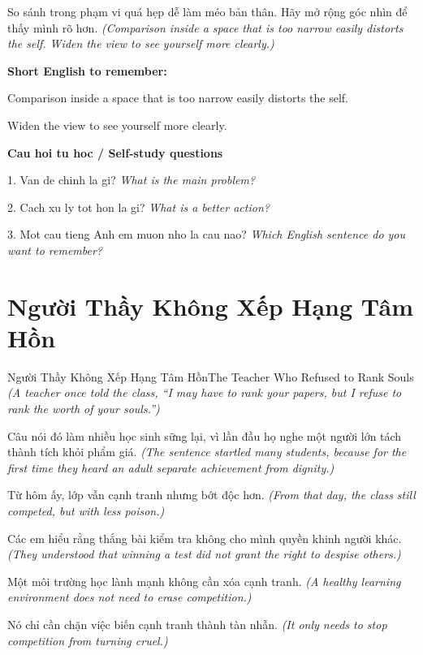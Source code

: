 \begin{baihoc}
So sánh trong phạm vi quá hẹp dễ làm méo bản thân. Hãy mở rộng góc nhìn để thấy mình rõ hơn.
\textit{(Comparison inside a space that is too narrow easily distorts the self. Widen the view to see yourself more clearly.)}
\end{baihoc}

\begin{ghinhoanh}
\textbf{Short English to remember:}

Comparison inside a space that is too narrow easily distorts the self.

Widen the view to see yourself more clearly.

\end{ghinhoanh}

\begin{tuhocnhanh}
\textbf{Cau hoi tu hoc / Self-study questions}

1. Van de chinh la gi? \textit{What is the main problem?}

2. Cach xu ly tot hon la gi? \textit{What is a better action?}

3. Mot cau tieng Anh em muon nho la cau nao? \textit{Which English sentence do you want to remember?}
\end{tuhocnhanh}
\ngancach

\section{Người Thầy Không Xếp Hạng Tâm Hồn}
\begin{truyen}{Người Thầy Không Xếp Hạng Tâm Hồn}{The Teacher Who Refused to Rank Souls}
\textit{(A teacher once told the class, ``I may have to rank your papers, but I refuse to rank the worth of your souls.'')}

Câu nói đó làm nhiều học sinh sững lại, vì lần đầu họ nghe một người lớn tách thành tích khỏi phẩm giá.
\textit{(The sentence startled many students, because for the first time they heard an adult separate achievement from dignity.)}

Từ hôm ấy, lớp vẫn cạnh tranh nhưng bớt độc hơn.
\textit{(From that day, the class still competed, but with less poison.)}

Các em hiểu rằng thắng bài kiểm tra không cho mình quyền khinh người khác.
\textit{(They understood that winning a test did not grant the right to despise others.)}

Một môi trường học lành mạnh không cần xóa cạnh tranh.
\textit{(A healthy learning environment does not need to erase competition.)}

Nó chỉ cần chặn việc biến cạnh tranh thành tàn nhẫn.
\textit{(It only needs to stop competition from turning cruel.)}

\end{truyen}


